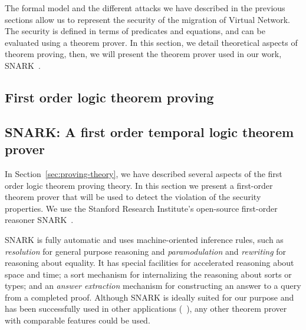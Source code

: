 The formal model and the different attacks we have described in the previous sections allow us to represent the security of the migration of Virtual Network. The security is defined in terms of predicates and equations, and can be evaluated using a theorem prover.
In this section, we detail theoretical aspects of theorem proving, then, we will present the theorem prover used in our work, SNARK~\cite{snark-Stickel2000}.

\subsection{First order logic theorem proving}



\subsection{SNARK: A first order temporal logic theorem prover}
\label{sec:proof-detects-violation}
In Section~\ref{sec:proving-theory}, we have described several aspects of the first order logic theorem proving theory.
In this section we  present a first-order theorem prover that will be used to detect the violation of the security properties.
We use the Stanford Research Institute's open-source first-order reasoner SNARK~\cite{snark-Stickel2000}.

SNARK is fully automatic and uses machine-oriented inference rules, such as \textit{resolution} for general purpose reasoning and \textit{paramodulation} and \textit{rewriting} for reasoning about equality.
It has special facilities
for accelerated reasoning about space and time; a sort mechanism for internalizing the reasoning about sorts or types; and an \textit{answer extraction} mechanism for constructing an answer to a query from a completed proof. 
Although SNARK is ideally suited for our purpose and has been successfully used in other applications (\eg~\cite{AICPub2006:2015}), any other theorem prover with comparable features could be used.

